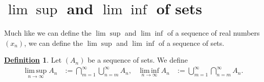 \documentclass[12pt]{book}
\numberwithin{equation}{chapter}
\theoremstyle{plain}
\numberwithin{theorem}{section}
\theoremstyle{definition}
\newtheorem{definition}[theorem]{\underline{Definition}}
\numberwithin{exercise}{chapter}
\newcommand{\<}{\langle}
\renewcommand{\>}{\rangle}
\renewcommand{\(}{\left(}
\renewcommand{\)}{\right)}
\renewcommand{\[}{\left[}
\renewcommand{\]}{\right]}
\renewcommand\limsup{\operatorname*{lim \, sup}}
\renewcommand\liminf{\operatorname*{lim \, inf}}
\begin{document}

\section{$\lim \sup$ and $\lim \inf$ of sets}
\label{sec:liminf.limsup}
Much like we can define the $\lim \sup$ and $\lim \inf$ of a sequence of real numbers $(x_n)$, we can define the $\lim \sup$ and $\lim \inf$ of a sequence of sets.

\begin{definition}
\label{def:liminf-limsup}
Let $(A_n)$ be a sequence of sets.  We define
\begin{align}
\limsup_{n \to \infty} A_n
	&:=	\bigcap_{m=1}^\infty \bigcup_{n=m}^\infty A_n , &
\liminf_{n \to \infty} A_n
	&:=	\bigcup_{m=1}^\infty \bigcap_{n=m}^\infty A_n .
\end{align}
\end{definition}
\end{document}
